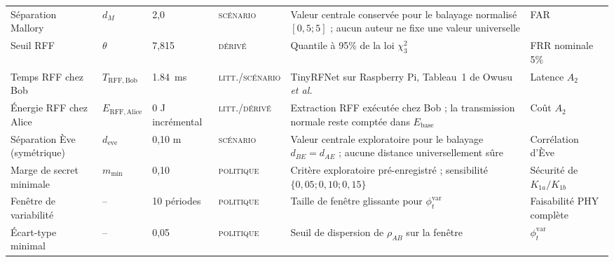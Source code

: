 \documentclass[conference,a4paper]{IEEEtran}
\newcommand{\statusLit}{\textsc{litt.}}
\newcommand{\statusDer}{\textsc{dérivé}}
\newcommand{\statusScen}{\textsc{scénario}}
\newcommand{\statusPol}{\textsc{politique}}
\begin{document}
\begin{table}[H]
\begin{tabularx}{\textwidth}{@{}l l l l Y Y@{}}
Séparation Mallory & $d_M$ & 2,0 & \statusScen{} & Valeur centrale conservée pour le balayage normalisé $[0{,}5;5]$ ; aucun auteur ne fixe une valeur universelle & FAR \\
Seuil RFF & $\theta$ & 7,815 & \statusDer{} & Quantile à 95\% de la loi $\chi^2_3$ & FRR nominale 5\% \\
Temps RFF chez Bob & $T_{\mathrm{RFF,Bob}}$ & \SI{1.84}{ms} & \statusLit{}/\statusScen{} & TinyRFNet sur Raspberry Pi, Tableau~1 de Owusu \emph{et al.} \cite{owusu2025} & Latence $A_2$ \\
Énergie RFF chez Alice & $E_{\mathrm{RFF,Alice}}$ & 0 J incrémental & \statusLit{}/\statusDer{} & Extraction RFF exécutée chez Bob ; la transmission normale reste comptée dans $E_{\mathrm{base}}$ \cite{haenel2021} & Coût $A_2$ \\
Séparation Ève (symétrique) & $d_{\mathrm{eve}}$ & 0,10 m & \statusScen{} & Valeur centrale exploratoire pour le balayage $d_{BE}=d_{AE}$ ; aucune distance universellement sûre & Corrélation d'Ève \\
Marge de secret minimale & $m_{\min}$ & 0,10 & \statusPol{} & Critère exploratoire pré-enregistré ; sensibilité $\{0{,}05;0{,}10;0{,}15\}$ & Sécurité de $K_{1a}/K_{1b}$ \\
Fenêtre de variabilité & -- & 10 périodes & \statusPol{} & Taille de fenêtre glissante pour $\phi_t^{\mathrm{var}}$ & Faisabilité PHY complète \\
Écart-type minimal & -- & 0,05 & \statusPol{} & Seuil de dispersion de $\rho_{AB}$ sur la fenêtre & $\phi_t^{\mathrm{var}}$ \\
\bottomrule
\end{tabularx}
\end{table}
\end{document}
